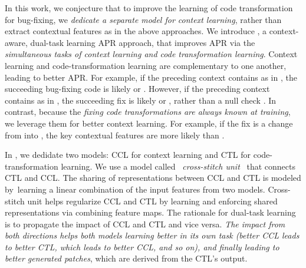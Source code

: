 In this work, we conjecture that to improve the learning of code
transformation for bug-fixing, we {\em dedicate a separate model for
  context learning}, rather than extract contextual features as in the
above approaches.
%
We introduce {\tool}, a context-aware, dual-task learning APR
approach, that improves APR via the {\em simultaneous tasks of context
  learning and code transformation learning}.  Context learning and
code-transformation learning are complementary to one another, leading
to better APR. For example, if the preceding context contains
 as in , the
succeeding bug-fixing code is likely  \code{!=}
 or  \code{==} . However, if the
preceding context contains  as in  \code{=}
, the succeeding fix is likely  \code{!=}  or  \code{==} ,
rather than a null check  \code{!=} . In
contrast, because the {\em fixing code transformations are always known at
  training}, we leverage them for better context learning. For
example, if the fix is a change from  \code{==}
 into  \code{!=} , the key
contextual features are more likely  than
.

\indent In {\tool}, we dedidate two models: CCL for context learning and CTL
for code-transformation learning. We use a model called~{\em
  cross-stitch unit}~\cite{misra2016cross} that connects CTL and
CCL. The sharing of representations between CCL and CTL is modeled
by~learning a linear combination of the input features from two
models. Cross-stitch unit helps regularize CCL and CTL by learning and
enforcing shared representations via combining feature maps. The
rationale for dual-task learning is to propagate the impact of CCL and
CTL and vice versa. {\em The impact from both directions helps both
  models learning better in its own task (better CCL leads to better
  CTL, which leads to better CCL, and so on), and finally leading to
  better generated patches}, which are derived from the CTL's output.

